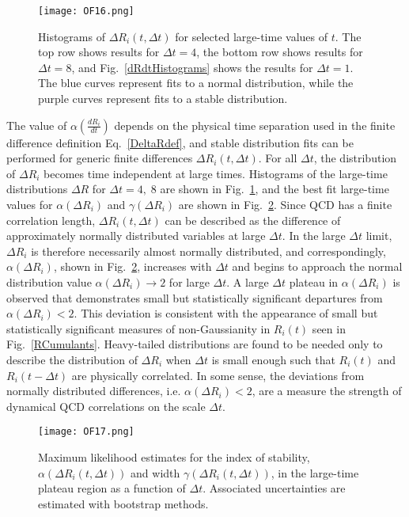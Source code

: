 %
\begin{figure}[!ht]
  \centering
  \texttt{[image: OF16.png]}
  \caption{
  Histograms of $\Delta R_i(t, \Delta t)$ for selected large-time values of $t$. 
  The top row shows results for  $\Delta t = 4$, 
  the bottom row shows results for  $\Delta t = 8$,
  and   Fig.~\ref{dRdtHistograms} shows the results for  $\Delta t = 1$. 
  The blue curves represent fits to a normal distribution, while the purple curves represent fits to a stable distribution.
  }
  \label{DeltaRHistograms}
\end{figure}
%
The value of $\alpha\left( \frac{dR_i}{dt} \right)$ depends on the physical time separation used in the finite difference 
definition Eq.~\eqref{DeltaRdef}, and 
stable distribution fits can be performed for generic finite differences $\Delta R_i(t, \Delta t)$. 
For all $\Delta t$, the distribution of $\Delta R_i$ becomes time independent at large times. 
Histograms of the large-time distributions $\Delta R$ for $\Delta t = 4,\;8$ are shown in Fig.~\ref{DeltaRHistograms}, and 
the best fit large-time values for $\alpha\left( \Delta R_i\right)$ and $\gamma\left( \Delta R_i \right)$ are shown in Fig.~\ref{DeltaRStable}. 
Since QCD has a finite correlation length,  $\Delta R_i(t, \Delta t)$ can be described as the difference of 
approximately normally distributed variables at large $\Delta t$. 
In the large $\Delta t$ limit, $\Delta R_i$ is therefore necessarily almost normally distributed,
and correspondingly, $\alpha(\Delta R_i)$, shown in Fig.~\ref{DeltaRStable}, 
increases with  $\Delta t$ and begins to approach the 
normal distribution value $\alpha(\Delta R_i)\rightarrow 2$ for large $\Delta t$. 
A large $\Delta t$ plateau in $\alpha(\Delta R_i)$ is observed that demonstrates small but statistically significant departures from $\alpha(\Delta R_i)< 2$.
This deviation is consistent with the appearance of small but statistically significant measures of non-Gaussianity in $R_i(t)$ seen in Fig.~\ref{RCumulants}.
Heavy-tailed distributions are 
found to be needed only to describe the distribution of $\Delta R_i$ when $\Delta t$ is small enough such 
that $R_i(t)$ and $R_i(t-\Delta t)$ are physically correlated. 
In some sense, the deviations from normally distributed differences, i.e. $\alpha(\Delta R_i) < 2$, are a measure 
the strength of dynamical QCD correlations on the scale $\Delta t$.
%
\begin{figure}[!ht]
  \centering
  \texttt{[image: OF17.png]}
  \caption{
  Maximum likelihood estimates for the index of stability, $\alpha\left(\Delta R_i(t, \Delta t)\right)$ and width $\gamma\left( \Delta R_i(t, \Delta t) \right)$, in the large-time 
  plateau region as a function of $\Delta t$.  Associated uncertainties are estimated with bootstrap methods.
  }
  \label{DeltaRStable}
\end{figure}
%



